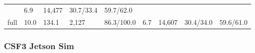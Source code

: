 \documentclass[
  9pt, a4paper, landscape]{article}
\begin{document}
\begin{longtable}[]{@{}lllllllll@{}}
\begin{minipage}[t]{0.08\columnwidth}
\end{minipage} & \begin{minipage}[t]{0.08\columnwidth}\raggedright
6.9\strut
\end{minipage} & \begin{minipage}[t]{0.08\columnwidth}\raggedright
14,477\strut
\end{minipage} & \begin{minipage}[t]{0.08\columnwidth}\raggedright
30.7/33.4\strut
\end{minipage} & \begin{minipage}[t]{0.08\columnwidth}\raggedright
59.7/62.0\strut
\end{minipage}\tabularnewline
\begin{minipage}[t]{0.08\columnwidth}\raggedright
full\strut
\end{minipage} & \begin{minipage}[t]{0.08\columnwidth}\raggedright
10.0\strut
\end{minipage} & \begin{minipage}[t]{0.08\columnwidth}\raggedright
134.1\strut
\end{minipage} & \begin{minipage}[t]{0.08\columnwidth}\raggedright
2,127\strut
\end{minipage} & \begin{minipage}[t]{0.08\columnwidth}\raggedright
86.3/100.0\strut
\end{minipage} & \begin{minipage}[t]{0.08\columnwidth}\raggedright
6.7\strut
\end{minipage} & \begin{minipage}[t]{0.08\columnwidth}\raggedright
14,607\strut
\end{minipage} & \begin{minipage}[t]{0.08\columnwidth}\raggedright
30.4/34.0\strut
\end{minipage} & \begin{minipage}[t]{0.08\columnwidth}\raggedright
59.6/61.0\strut
\end{minipage}\tabularnewline
\bottomrule
\end{longtable}

\hypertarget{csf3-jetson-sim}{%
\subsubsection{CSF3 Jetson Sim}\label{csf3-jetson-sim}}
\end{document}

